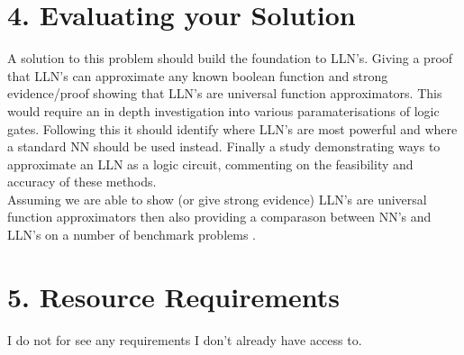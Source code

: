 \documentclass[11pt, a4paper, twoside, openright]{report}
\begin{document}
\section*{4. Evaluating your Solution}

A solution to this problem should build the foundation to LLN's. Giving a proof that LLN's can approximate any known boolean function and strong evidence/proof showing that LLN's are universal function approximators. This would require an in depth investigation into various paramaterisations of logic gates. Following this it should identify where LLN's are most powerful and where a standard NN should be used instead. Finally a study demonstrating ways to approximate an LLN as a logic circuit, commenting on the feasibility and accuracy of these methods.\\

Assuming we are able to show (or give strong evidence) LLN's are universal function approximators then also providing a comparason between NN's and LLN's on a number of benchmark problems .

\section*{5. Resource Requirements}

I do not for see any requirements I don't already have access to.

\backmatter

%


\end{document}
